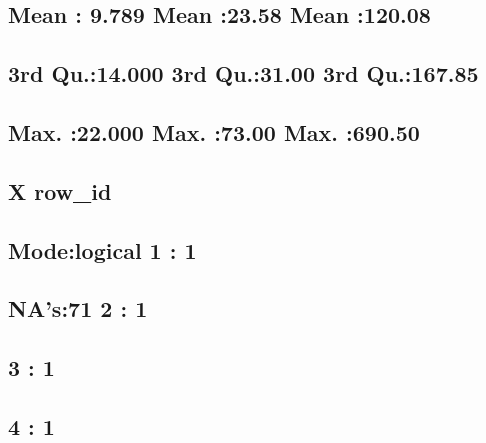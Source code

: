 \documentclass[
]{article}
\begin{document}
\hypertarget{mean-9.789-mean-23.58-mean-120.08}{%
\subsection{Mean : 9.789 Mean :23.58 Mean
:120.08}\label{mean-9.789-mean-23.58-mean-120.08}}

\hypertarget{rd-qu.14.000-3rd-qu.31.00-3rd-qu.167.85}{%
\subsection{3rd Qu.:14.000 3rd Qu.:31.00 3rd
Qu.:167.85}\label{rd-qu.14.000-3rd-qu.31.00-3rd-qu.167.85}}

\hypertarget{max.-22.000-max.-73.00-max.-690.50}{%
\subsection{Max. :22.000 Max. :73.00 Max.
:690.50}\label{max.-22.000-max.-73.00-max.-690.50}}

\hypertarget{section}{%
\subsection{}\label{section}}

\hypertarget{x-row_id}{%
\subsection{X row\_id}\label{x-row_id}}

\hypertarget{modelogical-1-1}{%
\subsection{Mode:logical 1 : 1}\label{modelogical-1-1}}

\hypertarget{nas71-2-1}{%
\subsection{NA's:71 2 : 1}\label{nas71-2-1}}

\hypertarget{section-1}{%
\subsection{3 : 1}\label{section-1}}

\hypertarget{section-2}{%
\subsection{4 : 1}\label{section-2}}
\end{document}
